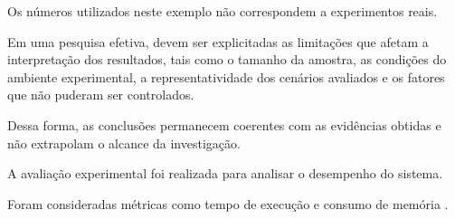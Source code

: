 Os números utilizados neste exemplo não correspondem a experimentos reais.

Em uma pesquisa efetiva, devem ser explicitadas as limitações que afetam a
interpretação dos resultados, tais como o tamanho da amostra, as condições do ambiente
experimental, a representatividade dos cenários avaliados e os fatores que não
puderam ser controlados.

Dessa forma, as conclusões permanecem coerentes com as evidências obtidas e não
extrapolam o alcance da investigação.

A avaliação experimental
foi realizada para analisar o desempenho
 do sistema.

Foram consideradas métricas como tempo de
execução
e consumo de memória
.

%
%
%
